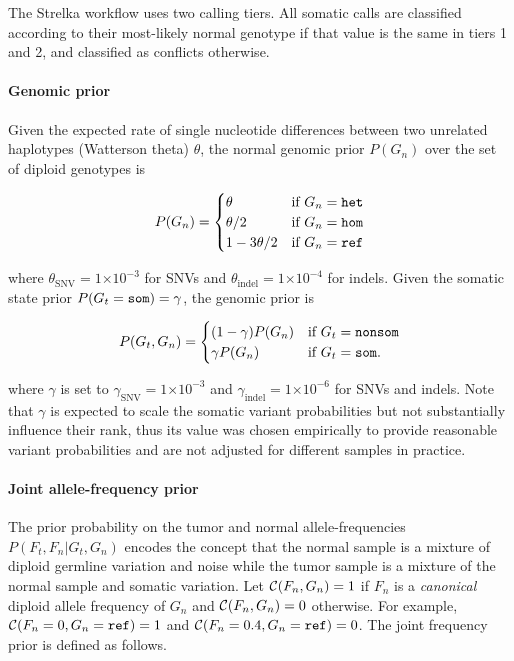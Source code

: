 \documentclass{article}
\newcommand{\e}[1]{\ensuremath{\times 10^{#1}}}
\begin{document}
The Strelka workflow uses two calling tiers. All somatic calls are classified according to their most-likely normal genotype if that value is the same in tiers 1 and 2, and classified as conflicts otherwise.

\paragraph{Genomic prior}
Given the expected rate of single nucleotide differences between two unrelated haplotypes (Watterson theta) $\theta$, the normal genomic prior $P(G_n)$ over the set of diploid genotypes is

\begin{equation*}
P(G_n)=
\begin{cases}
	\theta & \text{if } G_n = {\tt het} \\
	\theta/2 & \text{if } G_n = {\tt hom} \\
	1 - 3\theta/2 & \text{if } G_n = {\tt ref} \\
\end{cases}
\end{equation*}

\noindent where $\theta_{\text{SNV}}=1\e{-3}$ for SNVs and $\theta_{\text{indel}}=1\e{-4}$ for indels. Given the somatic state prior $P(G_t={\tt som}) = \gamma$, the genomic prior is

\begin{equation*}
P(G_t, G_n)=
\begin{cases}
	(1 - \gamma) P(G_n) & \text{if } G_t = {\tt nonsom} \\
	\gamma P(G_n) & \text{if } G_t = {\tt som}. \\
\end{cases}
\end{equation*}

\noindent where $\gamma$ is set to $\gamma_{\text{SNV}} = 1\e{-3}$ and $\gamma_{\text{indel}} = 1\e{-6}$ for SNVs and indels. Note that $\gamma$ is expected to scale the somatic variant probabilities but not substantially influence their rank, thus its value was chosen empirically to provide reasonable variant probabilities and are not adjusted for different samples in practice.


\paragraph{Joint allele-frequency prior}
The prior probability on the tumor and normal allele-frequencies $P(F_t, F_n|G_t, G_n)$ encodes the concept that the normal sample is a mixture of diploid germline variation and noise while the tumor sample is a mixture of the normal sample and somatic variation. Let ${\cal C} (F_n, G_n) = 1$ if $F_n$ is a {\em canonical} diploid allele frequency of $G_n$ and ${\cal C} (F_n, G_n) = 0$ otherwise. For example, ${\cal C} (F_n=0, G_n = {\tt ref}) = 1$ and ${\cal C} (F_n=0.4, G_n = {\tt ref}) = 0$. The joint frequency prior is defined as follows.
\end{document}
